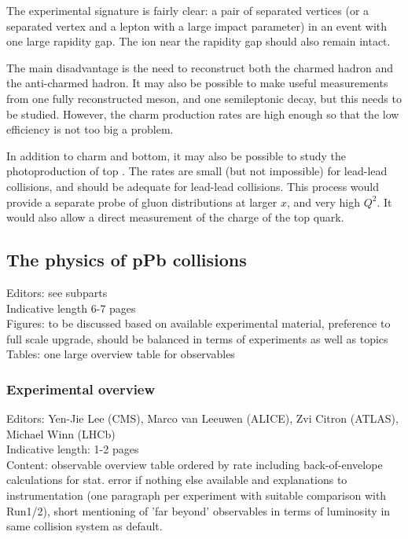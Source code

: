 \documentclass[../report.tex]{subfiles}
\begin{document}
The experimental signature is fairly clear: a pair of separated vertices (or a separated vertex and a lepton with a large impact parameter) in an event with one large rapidity gap. The ion near the rapidity gap should also remain intact. 

The main disadvantage is the need to reconstruct both the charmed hadron and the anti-charmed hadron.  It may also be possible to make useful measurements from one fully reconstructed meson, and one semileptonic decay, but this needs to be studied.  However, the charm production rates are high enough so that the low efficiency is not too big a problem.

In addition to charm and bottom, it may also be possible to study the photoproduction of top \cite{Klein:2000dk,Goncalves:2013oga}.   The rates are small (but not impossible) for lead-lead collisions, and should be adequate for lead-lead collisions.  This process would provide a separate probe of gluon distributions at larger $x$, and very high $Q^2$.  It would also allow a direct measurement of the charge of the top quark. 


\subsection{The physics of pPb collisions}
Editors: see subparts\\
Indicative length 6-7 pages\\
Figures: to be discussed based on available experimental material, preference to full scale upgrade, should be balanced in terms of experiments as well as topics\\
Tables: one large overview table for observables
\subsubsection{Experimental overview}
Editors: Yen-Jie Lee (CMS), Marco van Leeuwen (ALICE), Zvi Citron (ATLAS), Michael Winn (LHCb)\\
Indicative length: 1-2 pages\\
Content: observable overview table ordered by rate including back-of-envelope calculations for stat. error if nothing else available and explanations to instrumentation (one paragraph per experiment with suitable comparison with Run1/2), short mentioning of 'far beyond' observables in terms of luminosity in same collision system as default.
\end{document}
